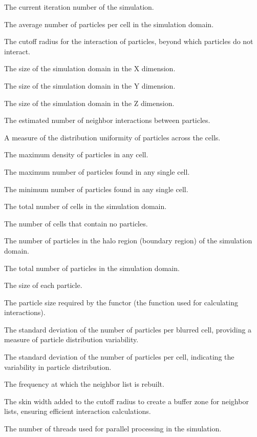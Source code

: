 \begin{description}[style=multiline, leftmargin =40mm]
    \item [Iteration] The current iteration number of the simulation.
    \item [avgParticlesPerCell] The average number of particles per cell in the simulation domain.
    \item [cutoff] The cutoff radius for the interaction of particles, beyond which particles do not interact.
    \item [domainSizeX] The size of the simulation domain in the X dimension.
    \item [domainSizeY] The size of the simulation domain in the Y dimension.
    \item [domainSizeZ] The size of the simulation domain in the Z dimension.
    \item [estimatedNumNeighborInteractions] The estimated number of neighbor interactions between particles.
    \item [homogeneity] A measure of the distribution uniformity of particles across the cells. 
    \item [maxDensity] The maximum density of particles in any cell.
    \item [maxParticlesPerCell] The maximum number of particles found in any single cell.
    \item [minParticlesPerCell] The minimum number of particles found in any single cell.
    \item [numCells] The total number of cells in the simulation domain.
    \item [numEmptyCells] The number of cells that contain no particles.
    \item [numHaloParticles] The number of particles in the halo region (boundary region) of the simulation domain.
    \item [numParticles] The total number of particles in the simulation domain.
    \item [particleSize] The size of each particle. 
    \item [particleSizeNeededByFunctor] The particle size required by the functor (the function used for calculating interactions).
    \item [particlesPerBlurredCellStdDev] The standard deviation of the number of particles per blurred cell, providing a measure of particle distribution variability.
    \item [particlesPerCellStdDev] The standard deviation of the number of particles per cell, indicating the variability in particle distribution.
    \item [rebuildFrequency] The frequency at which the neighbor list is rebuilt.
    \item [skin] The skin width added to the cutoff radius to create a buffer zone for neighbor lists, ensuring efficient interaction calculations.
    \item [threadCount] The number of threads used for parallel processing in the simulation.
\end{description}


